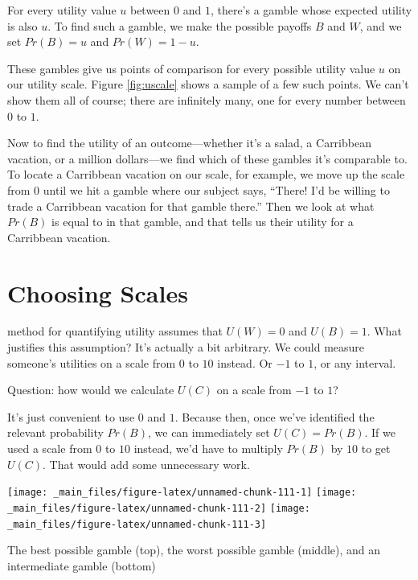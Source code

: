 \documentclass[justified]{tufte-book}
\renewcommand{\u}{U}
\newcommand{\p}{Pr}
\theoremstyle{definition}
\theoremstyle{definition}
\theoremstyle{definition}
\theoremstyle{remark}
\begin{document}
For every utility value \(u\) between \(0\) and \(1\), there's a gamble
whose expected utility is also \(u\). To find such a gamble, we make the
possible payoffs \(B\) and \(W\), and we set \(\p(B) = u\) and
\(\p(W) = 1 - u\).

These gambles give us points of comparison for every possible utility
value \(u\) on our utility scale. Figure \ref{fig:uscale} shows a sample
of a few such points. We can't show them all of course; there are
infinitely many, one for every number between \(0\) to \(1\).

Now to find the utility of an outcome---whether it's a salad, a
Carribbean vacation, or a million dollars---we find which of these
gambles it's comparable to. To locate a Carribbean vacation on our
scale, for example, we move up the scale from 0 until we hit a gamble
where our subject says, ``There! I'd be willing to trade a Carribbean
vacation for that gamble there.'' Then we look at what \(\p(B)\) is
equal to in that gamble, and that tells us their utility for a
Carribbean vacation.

\hypertarget{choosing-scales}{%
\section{Choosing Scales}\label{choosing-scales}}

 method for quantifying utility assumes that
\(\u(W) = 0\) and \(\u(B) = 1\). What justifies this assumption? It's
actually a bit arbitrary. We could measure someone's utilities on a
scale from \(0\) to \(10\) instead. Or \(-1\) to \(1\), or any interval.

\begin{marginfigure}
Question: how would we calculate \(\u(C)\) on a scale from \(-1\) to
\(1\)?
\end{marginfigure}

It's just convenient to use \(0\) and \(1\). Because then, once we've
identified the relevant probability \(\p(B)\), we can immediately set
\(\u(C) = \p(B)\). If we used a scale from \(0\) to \(10\) instead, we'd
have to multiply \(\p(B)\) by \(10\) to get \(\u(C)\). That would add
some unnecessary work.

\begin{marginfigure}
\texttt{[image: \_main\_files/figure-latex/unnamed-chunk-111-1]} \texttt{[image: \_main\_files/figure-latex/unnamed-chunk-111-2]} \texttt{[image: \_main\_files/figure-latex/unnamed-chunk-111-3]} \caption[The best possible gamble (top), the worst possible gamble (middle), and an intermediate gamble (bottom)]{The best possible gamble (top), the worst possible gamble (middle), and an intermediate gamble (bottom)}\label{fig:unnamed-chunk-111}
\end{marginfigure}
\end{document}
